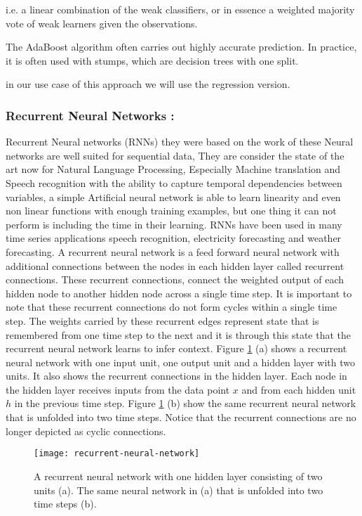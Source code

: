 i.e. a linear combination of the weak classifiers, or in essence a weighted majority vote of weak learners given the observations.

The AdaBoost algorithm often carries out highly accurate prediction.
In practice, it is often used with stumps, which are decision trees with one split.

in our use case of this approach we will use the regression version.


\subsubsection{Recurrent Neural Networks :}
Recurrent Neural networks (RNNs) they were based on the work of   \cite{rnn_hist} these Neural networks are  well suited for sequential  data, They are consider the state of the art now for Natural Language Processing, Especially Machine translation \citet{} and Speech recognition \cite{including126speech} with the ability to capture temporal dependencies between variables, a simple Artificial neural network is able to learn linearity and even non linear functions with enough training examples, but one thing it can not perform is including the time in their learning.  RNNs have been used in many time series applications speech recognition, electricity forecasting and weather forecasting.
A recurrent neural network is a feed forward neural network with additional connections between the nodes in each hidden layer called recurrent connections. These recurrent connections, connect the weighted output of each hidden node to another hidden node across a single time step. It is important to note that these recurrent connections do not form cycles within a single time step. The weights carried by these recurrent edges represent state that is remembered from one time step to the next and it is through this state that the recurrent neural network learns to infer context\cite{DBLP:journals/corr/Lipton15}.
Figure \ref{fig:recurrent-neural-network} (a) shows a recurrent neural network with one input unit, one output unit and a hidden layer with two units. It also shows the recurrent connections in the hidden layer. Each node in the hidden layer receives inputs from the data point $x$ and from each hidden unit $h$ in the previous time step. Figure \ref{fig:recurrent-neural-network} (b) show the same recurrent neural network that is unfolded into two time steps. Notice that the recurrent connections are no longer depicted as cyclic connections.

\begin{figure}
\centering	
\texttt{[image: recurrent-neural-network]}
\caption{A recurrent neural network with one hidden layer consisting of two units (a). The same neural network in (a) that is unfolded into two time steps (b).}
\label{fig:recurrent-neural-network}
\end{figure}


